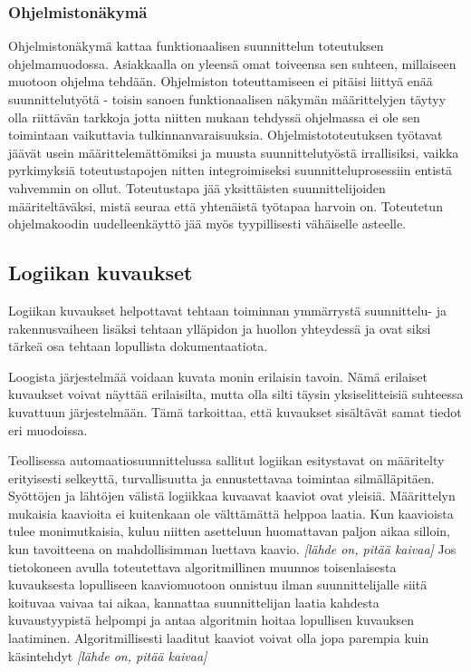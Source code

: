 \documentclass[finnish,12pt]{article}
\begin{document}
		\subsubsection{Ohjelmistonäkymä}

Ohjelmistonäkymä kattaa funktionaalisen suunnittelun toteutuksen ohjelmamuodossa.
Asiakkaalla on yleensä omat toiveensa sen suhteen, millaiseen muotoon ohjelma tehdään.
Ohjelmiston toteuttamiseen ei pitäisi liittyä enää suunnittelutyötä - toisin sanoen funktionaalisen näkymän määrittelyjen täytyy olla riittävän tarkkoja jotta niitten mukaan tehdyssä ohjelmassa ei ole sen toimintaan vaikuttavia tulkinnanvaraisuuksia.
Ohjelmistototeutuksen työtavat jäävät usein määrittelemättömiksi ja muusta suunnittelutyöstä irrallisiksi,
vaikka pyrkimyksiä toteutustapojen nitten integroimiseksi suunnitteluprosessiin entistä vahvemmin on ollut.
Toteutustapa jää yksittäisten suunnittelijoiden määriteltäväksi, mistä seuraa että yhtenäistä työtapaa harvoin on.
Toteutetun ohjelmakoodin uudelleenkäyttö jää myös tyypillisesti vähäiselle asteelle.


	\subsection{Logiikan kuvaukset}

Logiikan kuvaukset helpottavat tehtaan toiminnan ymmärrystä suunnittelu- ja rakennusvaiheen lisäksi tehtaan ylläpidon ja huollon yhteydessä ja
ovat siksi tärkeä osa tehtaan lopullista dokumentaatiota.

Loogista järjestelmää voidaan kuvata monin erilaisin tavoin.
Nämä erilaiset kuvaukset voivat näyttää erilaisilta, mutta olla silti täysin yksiselitteisiä suhteessa kuvattuun järjestelmään.
Tämä tarkoittaa, että kuvaukset sisältävät samat tiedot eri muodoissa.

Teollisessa automaatiosuunnittelussa sallitut logiikan esitystavat on määritelty erityisesti selkeyttä, turvallisuutta ja ennustettavaa toimintaa silmälläpitäen.
Syöttöjen ja lähtöjen välistä logiikkaa kuvaavat kaaviot ovat yleisiä.
Määrittelyn mukaisia kaavioita ei kuitenkaan ole välttämättä helppoa laatia.
Kun kaavioista tulee monimutkaisia, kuluu niitten asetteluun huomattavan paljon aikaa silloin, kun tavoitteena on mahdollisimman luettava kaavio. \emph{[lähde on, pitää kaivaa]}
Jos tietokoneen avulla toteutettava algoritmillinen muunnos toisenlaisesta kuvauksesta lopulliseen kaaviomuotoon onnistuu ilman suunnittelijalle siitä koituvaa vaivaa tai aikaa,
kannattaa suunnittelijan laatia kahdesta kuvaustyypistä helpompi ja antaa algoritmin hoitaa lopullisen kuvauksen laatiminen.
Algoritmillisesti laaditut kaaviot voivat olla jopa parempia kuin käsintehdyt  \emph{[lähde on, pitää kaivaa]}
\end{document}
